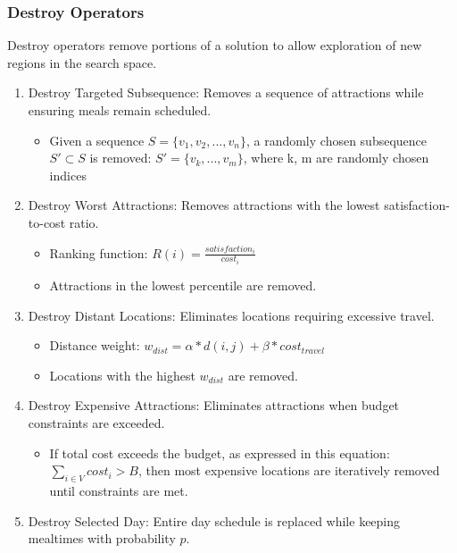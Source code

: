 \documentclass{ecai}
\begin{document}
\subsubsection{Destroy Operators}
Destroy operators remove portions of a solution to allow exploration of new regions in the search space.
\begin{enumerate}
    \item Destroy Targeted Subsequence: Removes a sequence of attractions while ensuring meals remain scheduled.
    \begin{itemize}
        \item Given a sequence $S = \{v_1,v_2,...,v_n\}$, a randomly chosen subsequence $S' \subset S$ is removed:
        $S'=\{v_k,...,v_m\}$, where k, m are randomly chosen indices
    \end{itemize}
    \item Destroy Worst Attractions: Removes attractions with the lowest satisfaction-to-cost ratio.
    \begin{itemize}
        \item Ranking function: $R(i) = \frac{satisfaction_i}{cost_i}$
        \item Attractions in the lowest percentile are removed.
    \end{itemize}
    \item Destroy Distant Locations: Eliminates locations requiring excessive travel.
    \begin{itemize}
        \item Distance weight: $w_{dist} = \alpha *d(i, j) + \beta *cost_{travel}$
        \item Locations with the highest $w_{dist}$ are removed.
    \end{itemize}
    \item Destroy Expensive Attractions: Eliminates attractions when budget constraints are exceeded.
    \begin{itemize}
        \item If total cost exceeds the budget, as expressed in this equation: $\sum_{i \in V} cost_i > B$, then most expensive locations are iteratively removed until constraints are met.
    \end{itemize}
    \item Destroy Selected Day: Entire day schedule is replaced while keeping mealtimes with probability $p$.
\end{enumerate}
\end{document}
